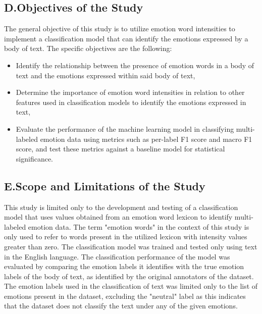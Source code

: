 \documentclass{icsthesis}
\begin{document}
\begin{mainmatter}
            \subsection{D.\hspace{0.5cm}Objectives of the Study}
                The general objective of this study is to utilize emotion word intensities to implement a classification model that can identify the emotions expressed by a body of text. The specific objectives are the following:

                \begin{itemize}
                    \item{Identify the relationship between the presence of emotion words in a body of text and the emotions expressed within said body of text,}
                    \item{Determine the importance of emotion word intensities in relation to other features used in classification models to identify the emotions expressed in text,}
                    \item{Evaluate the performance of the machine learning model in classifying multi-labeled emotion data using metrics such as per-label F1 score and macro F1 score, and test these metrics against a baseline model for statistical significance.}
                \end{itemize}
            \subsection{E.\hspace{0.5cm}Scope and Limitations of the Study}
                This study is limited only to the development and testing of a classification model that uses values obtained from an emotion word lexicon to identify multi-labeled emotion data. The term "emotion words" in the context of this study is only used to refer to words present in the utilized lexicon with intensity values greater than zero. The classification model was trained and tested only using text in the English language. The classification performance of the model was evaluated by comparing the emotion labels it identifies with the true emotion labels of the body of text, as identified by the original annotators of the dataset. The emotion labels used in the classification of text was limited only to the list of emotions present in the dataset, excluding the "neutral" label as this indicates that the dataset does not classify the text under any of the given emotions.
		

\end{mainmatter}
\end{document}
